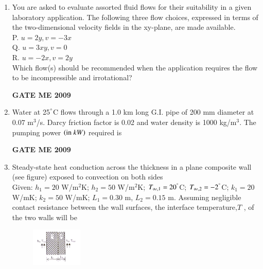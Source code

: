 \documentclass[journal]{IEEEtran}
\begin{document}
\begin{enumerate}[leftmargin=0pt]
\item You are asked to evaluate assorted fluid flows for their suitability in a given laboratory application.
The following three flow choices, expressed in terms of the two-dimensional velocity fields in the
xy-plane, are made available.\\
P. $u =2y, v =-3x$\\
Q. $u =3xy, v = 0$\\
R. $u=-2x, v=2y$\\
Which flow(s) should be recommended when the application requires the flow to be incompressible and
irrotational?

\begin{enumerate}
\hfill{\textbf{GATE ME 2009}}
\end{enumerate}

\item Water at 25$^\degree$C flows through a 1.0 km long G.I. pipe of 200 mm diameter at $0.07$ m$^3$/s. Darcy friction factor is 0.02 and water density is 1000 kg/m$^3$. The pumping power $\brak{\text{in} \ kW}$ required is
\begin{enumerate}
\hfill{\textbf{GATE ME 2009}}
\end{enumerate}

\item Steady-state heat conduction across the thickness in a plane composite wall (see figure) exposed to convection on both sides\\Given: $h_1 = 20$ W/m$^2$K; $h_2 = 50$ W/m$^2$K; $T_{\infty,1}=20^\degree$C; $T_{\infty,2}=-2^\degree$C; $k_1 = 20$ W/mK; $k_2 = 50$ W/mK; $L_1 = 0.30$ m, $L_2 = 0.15$ m. Assuming negligible contact resistance between the wall surfaces, the interface temperature,$T$ , of the two walls will be 
\begin{figure}[h]
  \centering
  \includegraphics[width=0.23\textwidth]{Figs/image (5).png}
  \caption{}
\end{figure}



\end{enumerate}
\end{document}
